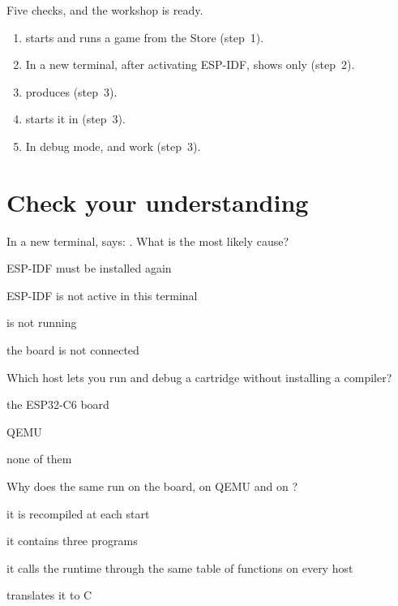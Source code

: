 Five checks, and the workshop is ready.

\begin{enumerate}
\item \prgqt starts and runs a game from the Store (step~1).
\item In a new terminal, after activating ESP-IDF,  shows only
   (step~2).
\item {} produces  (step~3).
\item {} starts it in \prgqt (step~3).
\item In debug mode,  and  work (step~3).
\end{enumerate}





\section{Check your understanding}

\begin{quiz}{In a new terminal,  says:
. What is the most likely cause?}
\item ESP-IDF must be installed again
\item ESP-IDF is not active in this terminal
\item \prgqt is not running
\item the board is not connected
\end{quiz}

\begin{quiz}{Which host lets you run and debug a cartridge without installing a compiler?}
\item the ESP32-C6 board
\item QEMU
\item \prgqt
\item none of them
\end{quiz}

\begin{quiz}{Why does the same  run on the board, on QEMU and on \prgqt?}
\item it is recompiled at each start
\item it contains three programs
\item it calls the runtime through the same table of functions on every host
\item \prgqt translates it to C
\end{quiz}

